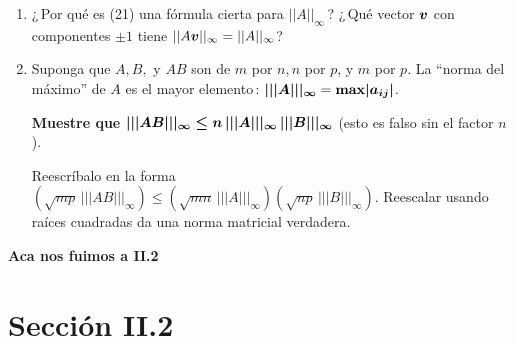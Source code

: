 \documentclass[12pt,a4paper]{article}
\newcommand{\bi}[1]{\hbox{\boldmath$#1$}}
\newcommand\1{\mbox{\,\vrule height-0.8pt depth1.0pt width2pc\,}}
\newcommand\2{\mbox{\,\vrule height-0.8pt depth1.0pt width1pc\,}}
\newcommand{\bv}{\hbox{\boldmath$v$}}
\begin{document}
\begin{enumerate}
\item ¿\,Por qué es (21) una fórmula cierta para $||A||_\infty$\,? ¿\,Qué vector $\bv$ con componentes $\pm 1$ tiene $||A\bv||_\infty=||A||_\infty$? %
\item Suponga que $A,B,$ y $AB$ son de $m$ por $n, n$ por $p$, y $m$ por $p$. La ``norma del máximo'' de $A$ es el mayor elemento\,: $\bi{|||A|||_\infty}=\hbox{\textbf{max}}\bi{|a_{ij}|}$.

\vspace{-4pt}
\begin{center}
\textbf{Muestre que} $\bi{|||AB|||_\infty\leq n\,|||A|||_\infty\,|||B|||_\infty}$ (esto es falso sin el factor $n$).
\end{center}
\vspace{-4pt}

\noindent
Reescríbalo en la forma $(\sqrt{mp}\,|||AB|||_\infty)\leq(\sqrt{mn}\,|||A|||_\infty)(\sqrt{np}\,|||B|||_\infty)$. Reescalar usando raíces cuadradas da una norma matricial verdadera.

\end{enumerate}




 {\bf Aca nos fuimos a II.2}




\section{Sección II.2}
\end{document}

